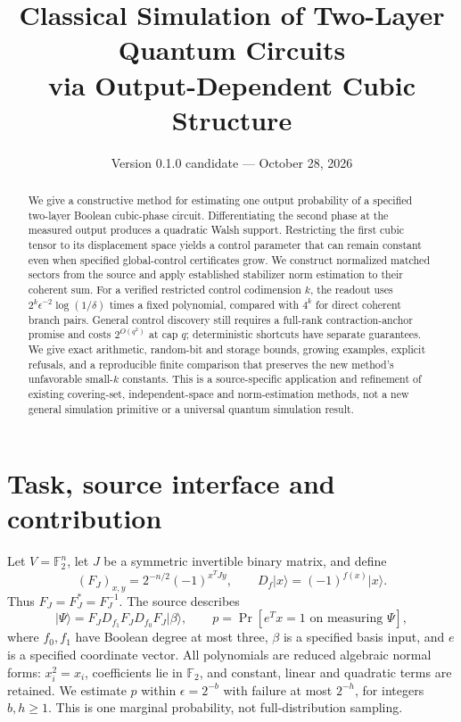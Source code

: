 \documentclass[11pt]{article}
\title{Classical Simulation of Two-Layer Quantum Circuits\\via Output-Dependent Cubic Structure}
\date{Version 0.1.0 candidate --- October 28, 2026}
\newcommand{\F}{\mathbb F_2}
\newcommand{\ket}[1]{\lvert #1\rangle}
\begin{document}
\maketitle
\begin{abstract}
We give a constructive method for estimating one output probability of a specified
two-layer Boolean cubic-phase circuit. Differentiating the second phase at the measured
output produces a quadratic Walsh support. Restricting the first cubic tensor to its
displacement space yields a control parameter that can remain constant even when
specified global-control certificates grow. We construct normalized matched sectors
from the source and apply established stabilizer norm estimation to their coherent
sum. For a verified restricted control codimension $k$, the readout uses
$2^k\epsilon^{-2}\log(1/\delta)$ times a fixed polynomial, compared with $4^k$ for
direct coherent branch pairs. General control discovery still requires a full-rank
contraction-anchor promise and costs $2^{O(q^2)}$ at cap $q$; deterministic shortcuts
have separate guarantees. We give exact arithmetic, random-bit and storage bounds,
growing examples, explicit refusals, and a reproducible finite comparison that preserves
the new method's unfavorable small-$k$ constants. This is a source-specific application
and refinement of existing covering-set, independent-space and norm-estimation methods,
not a new general simulation primitive or a universal quantum simulation result.
\end{abstract}

\section{Task, source interface and contribution}\label{sec:source}
Let $V=\F^n$, let $J$ be a symmetric invertible binary matrix, and define
\[
 (F_J)_{x,y}=2^{-n/2}(-1)^{x^TJy},\qquad
 D_f\ket{x}=(-1)^{f(x)}\ket{x}.
\]
Thus $F_J=F_J^*=F_J^{-1}$. The source describes
\begin{equation}\label{eq:circuit}
 \ket{\Psi}=F_JD_{f_1}F_JD_{f_0}F_J\ket{\beta},
 \qquad p=\Pr[e^Tx=1\text{ on measuring }\Psi],
\end{equation}
where $f_0,f_1$ have Boolean degree at most three, $\beta$ is a specified basis input,
and $e$ is a specified coordinate vector. All polynomials are reduced algebraic normal
forms: $x_i^2=x_i$, coefficients lie in $\F$, and constant, linear and quadratic terms
are retained. We estimate $p$ within $\epsilon=2^{-b}$ with failure at most $2^{-h}$,
for integers $b,h\geq1$. This is one marginal probability, not full-distribution sampling.
\end{document}
